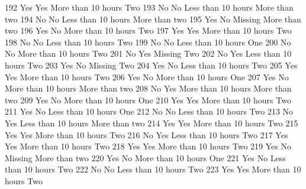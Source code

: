 \documentclass[
  letterpaper,
  DIV=11,
  numbers=noendperiod]{scrreprt}
\newenvironment{Shaded}{\begin{snugshade}}{\end{snugshade}}
\newcommand{\NormalTok}[1]{\textcolor[rgb]{0.00,0.23,0.31}{#1}}
\begin{document}
\begin{Shaded}
\begin{Highlighting}[]
\NormalTok{192               Yes            Yes More than 10 hours           Two}
\NormalTok{193                No             No Less than 10 hours More than two}
\NormalTok{194                No             No Less than 10 hours More than two}
\NormalTok{195               Yes             No            Missing More than two}
\NormalTok{196               Yes             No More than 10 hours           Two}
\NormalTok{197               Yes            Yes More than 10 hours           Two}
\NormalTok{198                No             No Less than 10 hours           Two}
\NormalTok{199                No             No Less than 10 hours           One}
\NormalTok{200                No             No More than 10 hours           Two}
\NormalTok{201                No            Yes            Missing           Two}
\NormalTok{202                No            Yes Less than 10 hours           Two}
\NormalTok{203               Yes             No            Missing           Two}
\NormalTok{204               Yes             No Less than 10 hours           Two}
\NormalTok{205               Yes            Yes More than 10 hours           Two}
\NormalTok{206               Yes             No More than 10 hours           One}
\NormalTok{207               Yes             No More than 10 hours More than two}
\NormalTok{208                No            Yes More than 10 hours More than two}
\NormalTok{209               Yes             No More than 10 hours           One}
\NormalTok{210               Yes            Yes More than 10 hours           Two}
\NormalTok{211               Yes             No Less than 10 hours           One}
\NormalTok{212                No             No Less than 10 hours           Two}
\NormalTok{213                No            Yes Less than 10 hours More than two}
\NormalTok{214               Yes            Yes More than 10 hours           Two}
\NormalTok{215               Yes            Yes More than 10 hours           Two}
\NormalTok{216                No            Yes Less than 10 hours           Two}
\NormalTok{217               Yes            Yes More than 10 hours           Two}
\NormalTok{218               Yes            Yes More than 10 hours           Two}
\NormalTok{219               Yes             No            Missing More than two}
\NormalTok{220               Yes             No More than 10 hours           One}
\NormalTok{221               Yes             No Less than 10 hours           Two}
\NormalTok{222                No             No Less than 10 hours           Two}
\NormalTok{223               Yes            Yes More than 10 hours           Two}

\end{Highlighting}
\end{Shaded}
\end{document}
